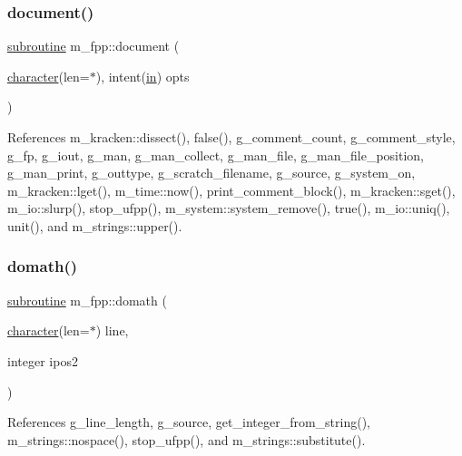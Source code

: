 \subsubsection{\texorpdfstring{document()}{document()}}
{\footnotesize\ttfamily \hyperlink{M__stopwatch_83_8txt_acfbcff50169d691ff02d4a123ed70482}{subroutine} m\+\_\+fpp\+::document (\begin{DoxyParamCaption}\item[{\hyperlink{option__stopwatch_83_8txt_abd4b21fbbd175834027b5224bfe97e66}{character}(len=$\ast$), intent(\hyperlink{M__journal_83_8txt_afce72651d1eed785a2132bee863b2f38}{in})}]{opts }\end{DoxyParamCaption})}



References m\+\_\+kracken\+::dissect(), false(), g\+\_\+comment\+\_\+count, g\+\_\+comment\+\_\+style, g\+\_\+fp, g\+\_\+iout, g\+\_\+man, g\+\_\+man\+\_\+collect, g\+\_\+man\+\_\+file, g\+\_\+man\+\_\+file\+\_\+position, g\+\_\+man\+\_\+print, g\+\_\+outtype, g\+\_\+scratch\+\_\+filename, g\+\_\+source, g\+\_\+system\+\_\+on, m\+\_\+kracken\+::lget(), m\+\_\+time\+::now(), print\+\_\+comment\+\_\+block(), m\+\_\+kracken\+::sget(), m\+\_\+io\+::slurp(), stop\+\_\+ufpp(), m\+\_\+system\+::system\+\_\+remove(), true(), m\+\_\+io\+::uniq(), unit(), and m\+\_\+strings\+::upper().

\mbox{\label{namespacem__fpp_acf16ae34a4c7e769114656c3dbbe0640}} 
\subsubsection{\texorpdfstring{domath()}{domath()}}
{\footnotesize\ttfamily \hyperlink{M__stopwatch_83_8txt_acfbcff50169d691ff02d4a123ed70482}{subroutine} m\+\_\+fpp\+::domath (\begin{DoxyParamCaption}\item[{\hyperlink{option__stopwatch_83_8txt_abd4b21fbbd175834027b5224bfe97e66}{character}(len=$\ast$)}]{line,  }\item[{integer}]{ipos2 }\end{DoxyParamCaption})}



References g\+\_\+line\+\_\+length, g\+\_\+source, get\+\_\+integer\+\_\+from\+\_\+string(), m\+\_\+strings\+::nospace(), stop\+\_\+ufpp(), and m\+\_\+strings\+::substitute().

